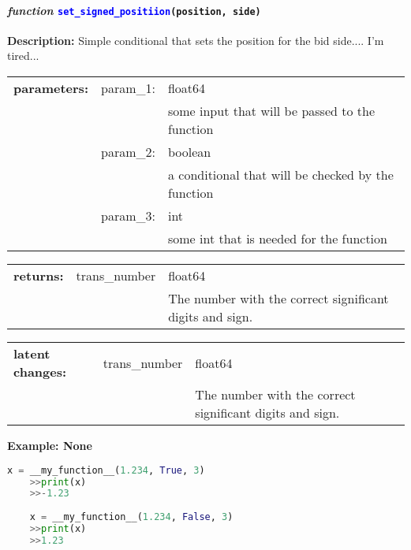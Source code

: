 \paragraph{\textit{function} \textcolor{blue}{\texttt{set\_signed\_positiion}}\texttt{(position, side)}}\hfill\break
\noindent \textbf{Description:} Simple conditional that sets the position for the bid side.... I'm tired...

\begin{tabular}{r r l }
	\textbf{parameters:}	& param\_1: & float64\\
	&  & some input that will be passed to the function\\
	& param\_2:& boolean\\
	&& a conditional that will be checked by the function\\
	& param\_3:& int\\
	&& some int that is needed for the function	
\end{tabular}

\begin{tabular}{l c l}
	\textbf{returns:} & trans\_number & float64\\
	& & The number with the correct significant digits and sign. 
\end{tabular}

\begin{tabular}{l c l}
	\textbf{latent changes:} & trans\_number & float64\\
	& & The number with the correct significant digits and sign. 
\end{tabular}

\textbf{Example: None}
\begin{lstlisting}[language=Python]
	x = __my_function__(1.234, True, 3)
	>>print(x)
	>>-1.23
	
	x = __my_function__(1.234, False, 3)
	>>print(x)
	>>1.23
\end{lstlisting}
